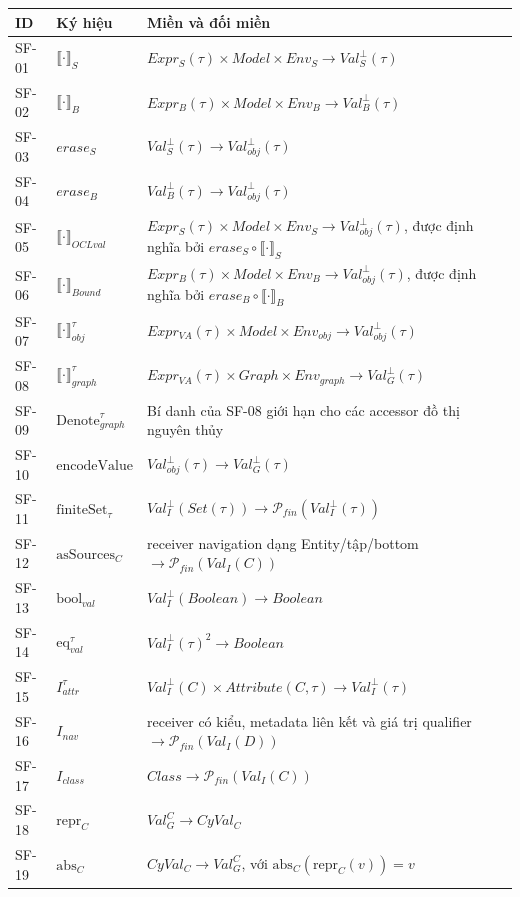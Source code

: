 \documentclass[11pt,a4paper]{article}
\theoremstyle{definition}
\newcommand{\boolval}{\mathrm{bool}_{val}}
\newcommand{\finiteSet}{\mathrm{finiteSet}}
\newcommand{\asSources}{\mathrm{asSources}}
\newcommand{\eqval}{\mathrm{eq}_{val}}
\newcommand{\encodeValue}{\mathrm{encodeValue}}
\newcommand{\sem}[2]{\llbracket #1 \rrbracket_{#2}}
\newcommand{\DenoteGraph}{\mathrm{Denote}_{graph}}
\newcommand{\reprC}{\mathrm{repr}_{C}}
\newcommand{\absC}{\mathrm{abs}_{C}}
\begin{document}
\scriptsize
\begin{longtable}{p{1.15cm}p{3.0cm}p{8.8cm}}
\toprule
ID & Ký hiệu & Miền và đối miền\\
\midrule
SF-01 & $\sem{\cdot}{S}$ & $Expr_S(\tau)\times Model\times Env_S\to Val_S^\bot(\tau)$\\
SF-02 & $\sem{\cdot}{B}$ & $Expr_B(\tau)\times Model\times Env_B\to Val_B^\bot(\tau)$\\
SF-03 & $erase_S$ & $Val_S^\bot(\tau)\to Val_{obj}^\bot(\tau)$\\
SF-04 & $erase_B$ & $Val_B^\bot(\tau)\to Val_{obj}^\bot(\tau)$\\
SF-05 & $\sem{\cdot}{OCLval}$ & $Expr_S(\tau)\times Model\times Env_S\to Val_{obj}^\bot(\tau)$, được định nghĩa bởi $erase_S\circ\sem{\cdot}{S}$\\
SF-06 & $\sem{\cdot}{Bound}$ & $Expr_B(\tau)\times Model\times Env_B\to Val_{obj}^\bot(\tau)$, được định nghĩa bởi $erase_B\circ\sem{\cdot}{B}$\\
SF-07 & $\sem{\cdot}{obj}^{\tau}$ & $Expr_{VA}(\tau)\times Model\times Env_{obj}\to Val_{obj}^\bot(\tau)$\\
SF-08 & $\sem{\cdot}{graph}^{\tau}$ & $Expr_{VA}(\tau)\times Graph\times Env_{graph}\to Val_G^\bot(\tau)$\\
SF-09 & $\DenoteGraph^{\tau}$ & Bí danh của SF-08 giới hạn cho các accessor đồ thị nguyên thủy\\
SF-10 & $\encodeValue$ & $Val_{obj}^\bot(\tau)\to Val_G^\bot(\tau)$\\
SF-11 & $\finiteSet_\tau$ & $Val_I^\bot(Set(\tau))\to\mathcal P_{fin}(Val_I^\bot(\tau))$\\
SF-12 & $\asSources_C$ & receiver navigation dạng Entity/tập/bottom $\to\mathcal P_{fin}(Val_I(C))$\\
SF-13 & $\boolval$ & $Val_I^\bot(Boolean)\to Boolean$\\
SF-14 & $\eqval^\tau$ & $Val_I^\bot(\tau)^2\to Boolean$\\
SF-15 & $I_{attr}^{\tau}$ & $Val_I^\bot(C)\times Attribute(C,\tau)\to Val_I^\bot(\tau)$\\
SF-16 & $I_{nav}$ & receiver có kiểu, metadata liên kết và giá trị qualifier $\to\mathcal P_{fin}(Val_I(D))$\\
SF-17 & $I_{class}$ & $Class\to\mathcal P_{fin}(Val_I(C))$\\
SF-18 & $\reprC$ & $Val_G^C\to CyVal_C$\\
SF-19 & $\absC$ & $CyVal_C\to Val_G^C$, với $\absC(\reprC(v))=v$\\

\end{longtable}
\end{document}
